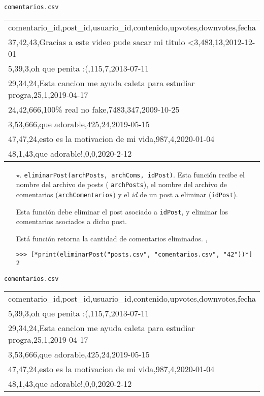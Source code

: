 \begin{center}
    \texttt{comentarios.csv} \\
	\begin{tabular}{|l|}
		\hline
comentario\_id,post\_id,usuario\_id,contenido,upvotes,downvotes,fecha\\
37,42,43,Gracias a este video pude sacar mi titulo <3,483,13,2012-12-01\\
5,39,3,oh que penita :(,115,7,2013-07-11\\
29,34,24,Esta cancion me ayuda caleta para estudiar progra,25,1,2019-04-17\\
24,42,666,100\% real no fake,7483,347,2009-10-25\\
3,53,666,que adorable,425,24,2019-05-15\\
47,47,24,esto es la motivacion de mi vida,987,4,2020-01-04\\
48,1,43,que adorable!,0,0,2020-2-12\\
		\hline
	\end{tabular}

\end{center}

\begin{enumerate}

    \item[$\star$. ] \texttt{eliminarPost(archPosts, archComs, idPost)}. Esta función recibe el nombre del archivo de posts ( \texttt{archPosts}), el nombre del archivo de comentarios (\texttt{archComentarios}) y el \textit{id} de un post a eliminar (\texttt{idPost}).
    
    Esta función debe eliminar el post asociado a \texttt{idPost}, y eliminar los comentarios asociados a dicho post.

    Está función retorna la cantidad de comentarios eliminados.
,  
    \begin{lstlisting}[style=consola]
>>> [*print(eliminarPost("posts.csv", "comentarios.csv", "42"))*]
2
    \end{lstlisting}

\end{enumerate}


\begin{center}
    \texttt{comentarios.csv} \\
	\begin{tabular}{|l|}
		\hline
comentario\_id,post\_id,usuario\_id,contenido,upvotes,downvotes,fecha\\
5,39,3,oh que penita :(,115,7,2013-07-11\\
29,34,24,Esta cancion me ayuda caleta para estudiar progra,25,1,2019-04-17\\
3,53,666,que adorable,425,24,2019-05-15\\
47,47,24,esto es la motivacion de mi vida,987,4,2020-01-04\\
48,1,43,que adorable!,0,0,2020-2-12\\
		\hline
	\end{tabular}
\end{center}


